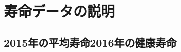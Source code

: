 %
%
%
%
%
%
%
%






%
%
%
%
%
%
%
%
%
%
%
%
%
%
%




\chapter{寿命データの説明}

\section{2015年の平均寿命2016年の健康寿命}


